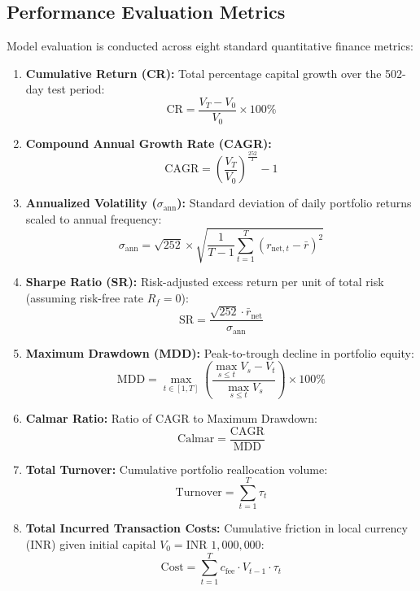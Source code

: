 \documentclass[conference]{IEEEtran}
\begin{document}
\subsection{Performance Evaluation Metrics}
Model evaluation is conducted across eight standard quantitative finance metrics:
\begin{enumerate}
    \item \textbf{Cumulative Return (CR):} Total percentage capital growth over the 502-day test period:
    \begin{equation}
        \text{CR} = \frac{V_T - V_0}{V_0} \times 100\%
    \end{equation}
    \item \textbf{Compound Annual Growth Rate (CAGR):}
    \begin{equation}
        \text{CAGR} = \left(\frac{V_T}{V_0}\right)^{\frac{252}{T}} - 1
    \end{equation}
    \item \textbf{Annualized Volatility ($\sigma_{\text{ann}}$):} Standard deviation of daily portfolio returns scaled to annual frequency:
    \begin{equation}
        \sigma_{\text{ann}} = \sqrt{252} \times \sqrt{\frac{1}{T-1} \sum_{t=1}^T (r_{\text{net}, t} - \bar{r})^2}
    \end{equation}
    \item \textbf{Sharpe Ratio (SR):} Risk-adjusted excess return per unit of total risk (assuming risk-free rate $R_f = 0$):
    \begin{equation}
        \text{SR} = \frac{\sqrt{252} \cdot \bar{r}_{\text{net}}}{\sigma_{\text{ann}}}
    \end{equation}
    \item \textbf{Maximum Drawdown (MDD):} Peak-to-trough decline in portfolio equity:
    \begin{equation}
        \text{MDD} = \max_{t \in [1, T]} \left( \frac{\max_{s \le t} V_s - V_t}{\max_{s \le t} V_s} \right) \times 100\%
    \end{equation}
    \item \textbf{Calmar Ratio:} Ratio of CAGR to Maximum Drawdown:
    \begin{equation}
        \text{Calmar} = \frac{\text{CAGR}}{\text{MDD}}
    \end{equation}
    \item \textbf{Total Turnover:} Cumulative portfolio reallocation volume:
    \begin{equation}
        \text{Turnover} = \sum_{t=1}^T \tau_t
    \end{equation}
    \item \textbf{Total Incurred Transaction Costs:} Cumulative friction in local currency (INR) given initial capital $V_0 = \text{INR } 1,000,000$:
    \begin{equation}
        \text{Cost} = \sum_{t=1}^T c_{\text{fee}} \cdot V_{t-1} \cdot \tau_t
    \end{equation}
\end{enumerate}
\end{document}
